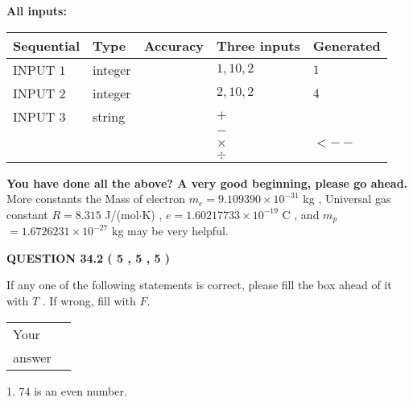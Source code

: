 \documentclass[12pt]{article}
\begin{document}
   
   
   
\noindent\vspace{0.1in}\hspace{-0.08in} {\textbf{\Large{All inputs: }}}
   
   
  
  
\noindent\begin{tabular}{|l|l|l|l|l|}
\hline
 Sequential & Type & Accuracy & Three inputs & Generated \\ 
\hline
 
 
  INPUT $            1 $ & integer &  & $
 1
 , 
 10
 , 
 2
 $ & $ 1 $ 
 \\  \hline  
 
 
  INPUT $            2 $ & integer &  & $
 2
 , 
 10
 , 
 2
 $ & $ 4 $ 
 \\  \hline  
 
 
  INPUT $            3 $ & string & & 
 $+$ & 
  \\
  & & & 
 $-$ & 
  \\
  & & & 
 $\times$ & 
  $ <-- $ 
  \\
  & & & 
 $\div$ & 
 \\  \hline  
 \end{tabular}
   
   
   
   
\vspace{0.3in}
{\textbf{\LARGE{You have done all the above? A very good beginning, please go ahead.}}}
More constants the
Mass of electron
$m_e$$ =
9.109390 \times 10^{-31} $
kg
,
Universal gas constant
$R$$ =
8.315 $
J/(mol$\cdot $K)
,
$e$$ =
1.60217733 \times 10^{-19} $
C
, and
$m_p$$ =
1.6726231 \times 10^{-27} $
kg
%
may be very helpful.
\vspace{0.3in}
   
   
  
\vspace{0.2in}
  
{\textbf{\Large{QUESTION
34.2 
 (           5 ,           5 ,           5 )
}}}
  
  
If any one of the following statements is correct, please fill the box ahead of it with $T$ .
If wrong, fill with $F$.
 
\noindent\begin{tabular}{|l|l|}\hline Your&\hspace{.2in} \\ answer&\hspace{.2in} \\ \hline \end{tabular}
1. $ %
74$ is an  %
even number.
 
\end{document}
